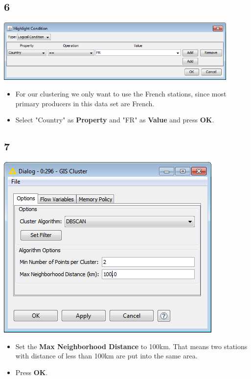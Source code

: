 \documentclass{beamer}
\begin{document}
\subsection{6}
\begin{frame}
	\begin{center}
  		\includegraphics[width=0.9\textwidth]{6.png}
	\end{center}
	\begin{itemize}
		\item For our clustering we only want to use the French stations, since most primary producers in this data set are French.
		\item Select "Country" as \textbf{Property} and "FR" as \textbf{Value} and press \textbf{OK}.
	\end{itemize}
\end{frame}

\subsection{7}
\begin{frame}
	\begin{center}
  		\includegraphics[height=0.6\textheight]{7.png}
	\end{center}
	\begin{itemize}
		\item Set the \textbf{Max Neighborhood Distance} to 100km. That means two stations with distance of less than 100km are put into the same area.
		\item Press \textbf{OK}.
	\end{itemize}
\end{frame}
\end{document}
